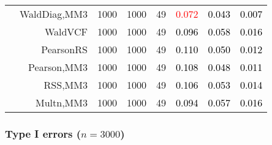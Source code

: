 \documentclass[
]{article}
\begin{document}
\begin{table}[H]
{\begin{tabular}[t]{lrrrrrrr}
\hspace{1em} & WaldDiag,MM3 & 1000 & 1000 & 49 & \textcolor{red}{0.072} & \textcolor{black}{0.043} & \textcolor{black}{0.007}\\

\hspace{1em} & WaldVCF & 1000 & 1000 & 49 & \textcolor{black}{0.096} & \textcolor{black}{0.058} & \textcolor{black}{0.016}\\

\hspace{1em} & PearsonRS & 1000 & 1000 & 49 & \textcolor{black}{0.110} & \textcolor{black}{0.050} & \textcolor{black}{0.012}\\

\hspace{1em} & Pearson,MM3 & 1000 & 1000 & 49 & \textcolor{black}{0.108} & \textcolor{black}{0.048} & \textcolor{black}{0.011}\\

\hspace{1em} & RSS,MM3 & 1000 & 1000 & 49 & \textcolor{black}{0.106} & \textcolor{black}{0.053} & \textcolor{black}{0.014}\\

\hspace{1em} & Multn,MM3 & 1000 & 1000 & 49 & \textcolor{black}{0.094} & \textcolor{black}{0.057} & \textcolor{black}{0.016}\\
\bottomrule
\end{tabular}}
\endgroup{}
\end{table}

\hypertarget{type-i-errors-n3000}{%
\subsubsection{\texorpdfstring{Type I errors
(\(n=3000\))}{Type I errors (n=3000)}}\label{type-i-errors-n3000}}
\end{document}
